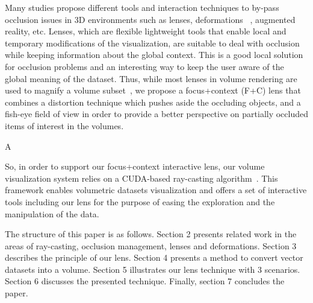 Many studies propose different tools and interaction techniques to by-pass occlusion issues in 3D environments such as lenses, deformations ~\cite{595268}, augmented reality, etc. Lenses, which are flexible lightweight tools that enable local and temporary modifications of the visualization, are suitable to deal with occlusion while keeping information about the global context. This is a good local solution for occlusion problems and an interesting way to keep the user aware of the global meaning of the dataset. Thus, while most lenses in volume rendering are used to magnify a volume subset~\cite{CGF:CGF12871}, we propose a focus+context (F+C) lens that combines a distortion technique which pushes aside the occluding objects, and a  fish-eye field of view in order to provide a better perspective on partially occluded items of interest in the volumes.  

A 


So, in order to support our focus+context interactive lens, our volume visualization system relies on a CUDA-based ray-casting algorithm~\cite{Roettger:2003:SHV:769922.769948}.  This framework enables volumetric datasets visualization and offers a set of interactive tools including our lens for the purpose of easing the exploration and the manipulation of the data.

The structure of this paper is as follows. Section 2 presents related work in the areas of ray-casting, occlusion management, lenses and deformations. Section 3 describes the principle of our lens. Section 4 presents a method to convert vector datasets into a volume. Section 5 illustrates our lens technique with 3 scenarios. Section 6 discusses the presented technique. Finally, section 7 concludes the paper. 